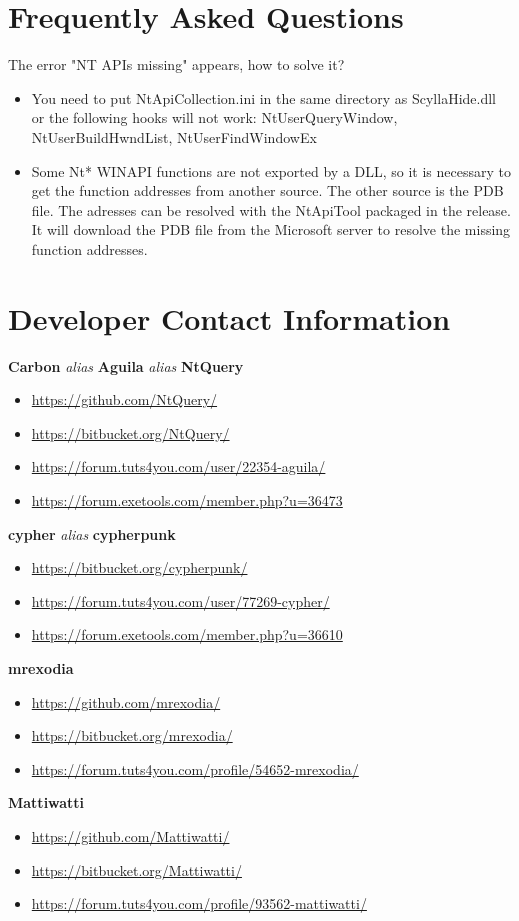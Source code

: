 \documentclass[10pt,a4paper]{article}
\begin{document}
\section{Frequently Asked Questions}
The error "NT APIs missing" appears, how to solve it?
\begin{itemize}
\item You need to put NtApiCollection.ini in the same directory as ScyllaHide.dll or the following hooks will not work: NtUserQueryWindow, NtUserBuildHwndList, NtUserFindWindowEx
\item Some Nt* WINAPI functions are not exported by a DLL, so it is necessary to get the function addresses from another source. The other source is the PDB file. The adresses can be resolved with the NtApiTool packaged in the release. It will download the PDB file from the Microsoft server to resolve the missing function addresses.
\end{itemize}

\section{Developer Contact Information}

\begin{center}
\textbf{Carbon} \textit{alias} \textbf{Aguila} \textit{alias} \textbf{NtQuery}
\begin{itemize}
\item \url{https://github.com/NtQuery/}
\item \url{https://bitbucket.org/NtQuery/}
\item \url{https://forum.tuts4you.com/user/22354-aguila/}
\item \url{https://forum.exetools.com/member.php?u=36473}
\end{itemize}


\textbf{cypher} \textit{alias} \textbf{cypherpunk}
\begin{itemize}
\item \url{https://bitbucket.org/cypherpunk/}
\item \url{https://forum.tuts4you.com/user/77269-cypher/}
\item \url{https://forum.exetools.com/member.php?u=36610}
\end{itemize}

\textbf{mrexodia}
\begin{itemize}
\item \url{https://github.com/mrexodia/}
\item \url{https://bitbucket.org/mrexodia/}
\item \url{https://forum.tuts4you.com/profile/54652-mrexodia/}
\end{itemize}

\textbf{Mattiwatti}
\begin{itemize}
\item \url{https://github.com/Mattiwatti/}
\item \url{https://bitbucket.org/Mattiwatti/}
\item \url{https://forum.tuts4you.com/profile/93562-mattiwatti/}
\end{itemize}
\end{center}
\end{document}
